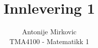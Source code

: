 \documentclass[10pt]{article}
\newenvironment{Oppgave}[2][Oppgave]{\begin{trivlist}
\item[\hskip \labelsep {\bfseries #1}\hskip \labelsep {\bfseries #2.}]}{\end{trivlist}}
\begin{document}
\title{Innlevering 1}
\author{Antonije Mirkovic\\
TMA4100 - Matematikk 1}
\maketitle
\begin{Oppgave}{1}

\end{Oppgave}

\begin{Oppgave}{2}

\end{Oppgave}

\begin{Oppgave}{3}

\end{Oppgave}

\begin{Oppgave}{4}

\end{Oppgave}

\begin{Oppgave}{5}

\end{Oppgave}

\begin{Oppgave}{6}

\end{Oppgave}
\end{document}
